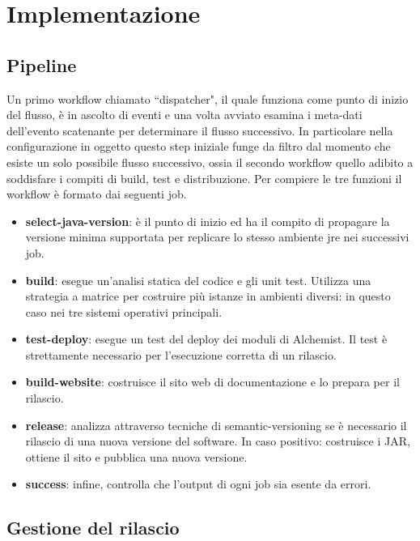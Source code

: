 \chapter{Implementazione}

\section{Pipeline}

Un primo workflow chiamato ``dispatcher", il quale funziona come punto di inizio del flusso, è in ascolto di eventi e una volta avviato esamina i meta-dati dell'evento scatenante per determinare il flusso successivo. In particolare nella configurazione in oggetto questo step iniziale funge da filtro dal momento che esiste un solo possibile flusso successivo, ossia il secondo workflow quello adibito a soddisfare i compiti di build, test e distribuzione.
Per compiere le tre funzioni il workflow è formato dai seguenti job.
\begin{itemize}
	\item \textbf{select-java-version}: è il punto di inizio ed ha il compito di propagare la versione minima supportata per replicare lo stesso ambiente \ac{jre} nei successivi job.
	\item \textbf{build}: esegue un'analisi statica del codice e gli unit test. Utilizza una strategia a matrice per costruire più istanze in ambienti diversi: in questo caso nei tre sistemi operativi principali. 
	\item \textbf{test-deploy}: esegue un test del deploy dei moduli di Alchemist. Il test è strettamente necessario per l'esecuzione corretta di un rilascio.
	\item \textbf{build-website}: costruisce il sito web di documentazione e lo prepara per il rilascio.
	\item \textbf{release}: analizza attraverso tecniche di semantic-versioning se è necessario il rilascio di una nuova versione del software. In caso positivo: costruisce i JAR, ottiene il sito e pubblica una nuova versione.
	\item \textbf{success}: infine, controlla che l'output di ogni job sia esente da errori.
\end{itemize}

\section{Gestione del rilascio}
